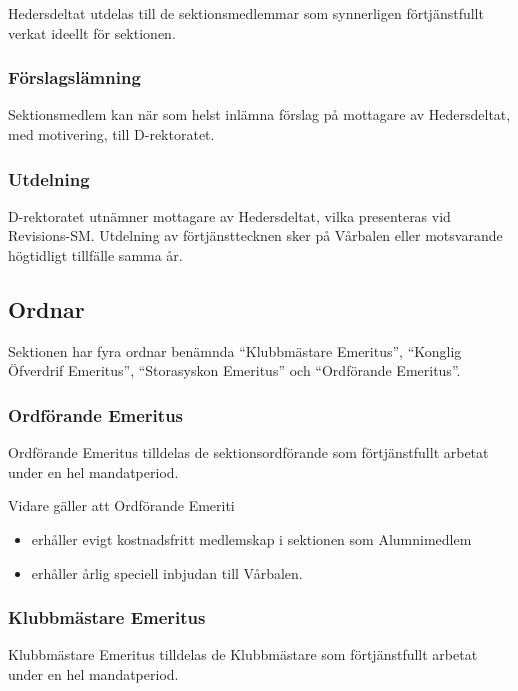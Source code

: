 \documentclass{dgovdoc}
\begin{document}
Hedersdeltat utdelas till de sektionsmedlemmar som synnerligen förtjänstfullt
verkat ideellt för sektionen.

\subsubsection{Förslagslämning}

Sektionsmedlem kan när som helst inlämna förslag på mottagare av Hedersdeltat,
med motivering, till D-rektoratet.

\subsubsection{Utdelning}

D-rektoratet utnämner mottagare av Hedersdeltat, vilka presenteras vid
Revisions-SM. Utdelning av förtjänsttecknen sker på Vårbalen eller motsvarande
högtidligt tillfälle samma år.

\subsection{Ordnar}

Sektionen har fyra ordnar benämnda ``Klubbmästare Emeritus'', ``Konglig
Öfverdrif Emeritus'', ``Storasyskon Emeritus'' och ``Ordförande Emeritus''.

\subsubsection{Ordförande Emeritus}

Ordförande Emeritus tilldelas de sektionsordförande som förtjänstfullt arbetat
under en hel mandatperiod.

Vidare gäller att Ordförande Emeriti

\begin{itemize}
  \item erhåller evigt kostnadsfritt medlemskap i sektionen som Alumnimedlem
  \item erhåller årlig speciell inbjudan till Vårbalen.
\end{itemize}

\subsubsection{Klubbmästare Emeritus}

Klubbmästare Emeritus tilldelas de Klubbmästare som förtjänstfullt arbetat
under en hel mandatperiod.
\end{document}
